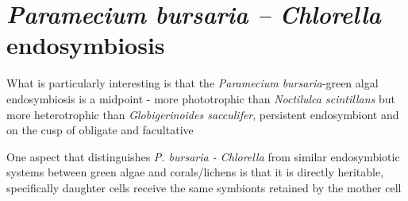 %
%
%
%
%
%
%
%
%

\section{\textit{Paramecium bursaria – Chlorella} endosymbiosis}

What is particularly interesting is that the \textit{Paramecium bursaria}-green algal endosymbiosis
is a midpoint  - more phototrophic than \textit{Noctilulca scintillans} but more heterotrophic than 
\textit{Globigerinoides sacculifer}, persistent endosymbiont and on the cusp of obligate and facultative \citep{Stoecker2009}


One aspect that distinguishes \textit{P. bursaria - Chlorella} from similar endosymbiotic systems between green algae and corals/lichens 
is that it is directly heritable, specifically daughter cells receive the same symbionts retained by the mother cell \citep{Siegel1960}


